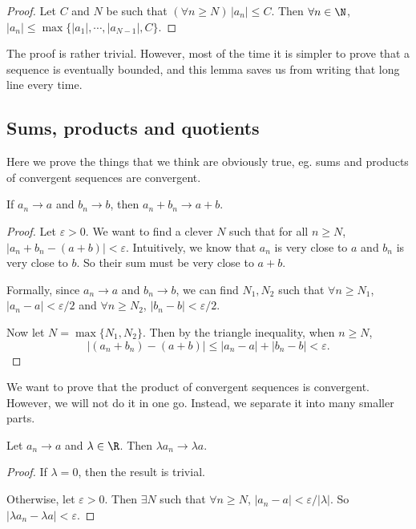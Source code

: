 \documentclass[a4paper]{article}
\begin{document}
\begin{proof}
  Let $C$ and $N$ be such that $(\forall n\geq N)\,|a_n| \leq C$. Then $\forall n \in \N$, $|a_n| \leq \max\{|a_1|, \cdots, |a_{N - 1}|, C\}$.
\end{proof}

The proof is rather trivial. However, most of the time it is simpler to prove that a sequence is eventually bounded, and this lemma saves us from writing that long line every time.

\subsection{Sums, products and quotients}
Here we prove the things that we think are obviously true, eg. sums and products of convergent sequences are convergent.

\begin{lemma}
  If $a_n \to a$ and $b_n \to b$, then $a_n + b_n \to a + b$.
\end{lemma}

\begin{proof}
  Let $\varepsilon > 0$. We want to find a clever $N$ such that for all $n \geq N$, $|a_n + b_n - (a+b)| < \varepsilon$. Intuitively, we know that $a_n$ is very close to $a$ and $b_n$ is very close to $b$. So their sum must be very close to $a + b$.

  Formally, since $a_n\to a$ and $b_n \to b$, we can find $N_1, N_2$ such that $\forall n \geq N_1$, $|a_n - a| < \varepsilon/2$ and $\forall n \geq N_2$, $|b_n - b| < \varepsilon/2$.

  Now let $N = \max\{N_1, N_2\}$. Then by the triangle inequality, when $n \geq N$,
  \[
    |(a_n + b_n) - (a + b)| \leq |a_n - a| + |b_n - b| < \varepsilon.
  \]
\end{proof}

We want to prove that the product of convergent sequences is convergent. However, we will not do it in one go. Instead, we separate it into many smaller parts.
\begin{lemma}
  Let $a_n \to a$ and $\lambda \in \R$. Then $\lambda a_n \to \lambda a$.
\end{lemma}

\begin{proof}
  If $\lambda = 0$, then the result is trivial.

  Otherwise, let $\varepsilon > 0$. Then $\exists N$ such that $\forall n \geq N$, $|a_n - a| < \varepsilon/|\lambda|$. So $|\lambda a_n - \lambda a| < \varepsilon$.
\end{proof}
\end{document}
